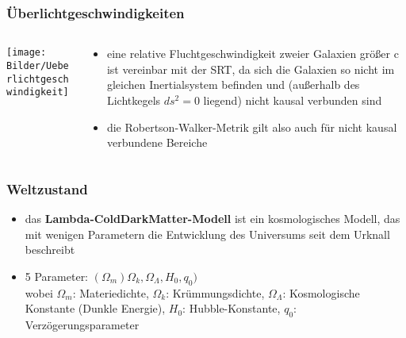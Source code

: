 \documentclass{beamer}
\begin{document}
\begin{frame}\frametitle{Überlichtgeschwindigkeiten}

\begin{columns}

\begin{column}{.48\textwidth}

\texttt{[image: Bilder/Ueberlichtgeschwindigkeit]}

\end{column}

\hfill

\begin{column}{.48\textwidth}

\begin{itemize}
\item eine relative Fluchtgeschwindigkeit zweier Galaxien größer c ist vereinbar mit der SRT, da sich die Galaxien so nicht im gleichen Inertialsystem befinden und (außerhalb des Lichtkegels $ds^2 = 0$ liegend) nicht kausal verbunden sind
\item die Robertson-Walker-Metrik gilt also auch für nicht kausal verbundene Bereiche
\end{itemize}

\end{column}

\end{columns}

\end{frame}

\begin{frame}\frametitle{Weltzustand}

\begin{itemize}
\item das \textbf{Lambda-ColdDarkMatter-Modell} ist ein kosmologisches Modell, das mit wenigen Parametern die Entwicklung des Universums seit dem Urknall beschreibt
\item 5 Parameter: $(\Omega_m)\Omega_k,\Omega_{\Lambda}, H_0, q_0)$\\[.1cm] wobei
$\Omega_m$: Materiedichte, $\Omega_k$: Krümmungsdichte, $\Omega_{\Lambda}$: Kosmologische Konstante (Dunkle Energie), $H_0$: Hubble-Konstante, $q_0$: Verzögerungsparameter
\end{itemize}

\end{frame}
\end{document}
